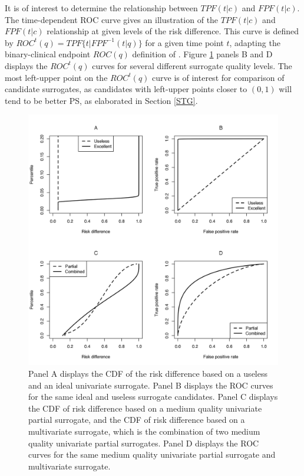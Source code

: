 \documentclass[times, doublespace]{simauth}
\begin{document}
It is of interest to determine the relationship between $TPF(t|c)$ and $FPF(t|c)$. The time-dependent ROC curve gives an illustration of the $TPF(t|c)$ and $FPF(t|c)$ relationship at given levels of the risk difference. This curve is defined by $ROC^{t}(q)=TPF\{t|FPF^{-1}(t|q)\}$ for a given time point $t$, adapting the binary-clinical endpoint $ROC(q)$ definition of \citet{Huang12b}. Figure \ref{4panel} panels B and D displays the $ROC^{t}(q)$ curves for several different surrogate quality levels. The most left-upper point on the $ROC^{t}(q)$ curve is of interest for comparison of candidate surrogates, as candidates with left-upper points closer to $(0,1)$ will tend to be better PS, as elaborated in Section \ref{STG}.
\begin{figure}
\begin{center}
\includegraphics[scale=0.80]{Figure1.jpeg}
\end{center}
\caption{Panel A displays the CDF of the risk difference based on a useless and an ideal univariate surrogate. Panel B displays the ROC curves for the same ideal and useless surrogate candidates. Panel C displays the CDF of risk difference based on a medium quality univariate partial surrogate, and the CDF of risk difference based on a multivariate surrogate, which is the combination of two medium quality univariate partial surrogates. Panel D displays the ROC curves for the same medium quality univariate partial surrogate and multivariate surrogate. \label{4panel}}
\end{figure}
\end{document}
